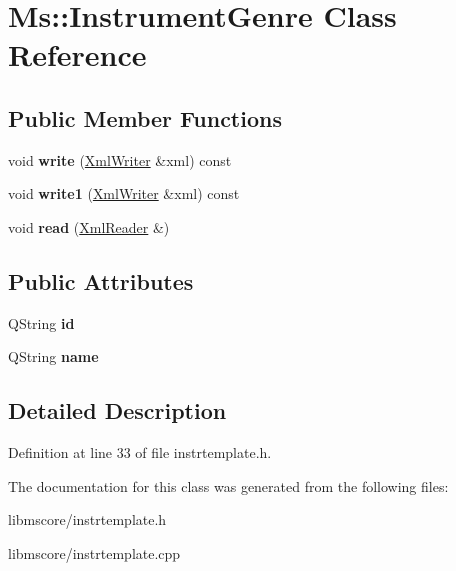 \hypertarget{class_ms_1_1_instrument_genre}{}\section{Ms\+:\+:Instrument\+Genre Class Reference}
\label{class_ms_1_1_instrument_genre}
\subsection*{Public Member Functions}
\begin{DoxyCompactItemize}
\item 
\mbox{\label{class_ms_1_1_instrument_genre_ae12eec4c608f82e56fa8de8c977e1f80}} 
void {\bfseries write} (\hyperlink{class_ms_1_1_xml_writer}{Xml\+Writer} \&xml) const
\item 
\mbox{\label{class_ms_1_1_instrument_genre_ad99512393e0372df61076513a890ec66}} 
void {\bfseries write1} (\hyperlink{class_ms_1_1_xml_writer}{Xml\+Writer} \&xml) const
\item 
\mbox{\label{class_ms_1_1_instrument_genre_a48a11d3f1402a523191ab82b7faa5e8c}} 
void {\bfseries read} (\hyperlink{class_ms_1_1_xml_reader}{Xml\+Reader} \&)
\end{DoxyCompactItemize}
\subsection*{Public Attributes}
\begin{DoxyCompactItemize}
\item 
\mbox{\label{class_ms_1_1_instrument_genre_acd82bb6db00ba54550faa7114c9ec578}} 
Q\+String {\bfseries id}
\item 
\mbox{\label{class_ms_1_1_instrument_genre_a1fbaf36840a6a3ddaa1b86bcf9bc0f2d}} 
Q\+String {\bfseries name}
\end{DoxyCompactItemize}


\subsection{Detailed Description}


Definition at line 33 of file instrtemplate.\+h.



The documentation for this class was generated from the following files\+:\begin{DoxyCompactItemize}
\item 
libmscore/instrtemplate.\+h\item 
libmscore/instrtemplate.\+cpp\end{DoxyCompactItemize}
